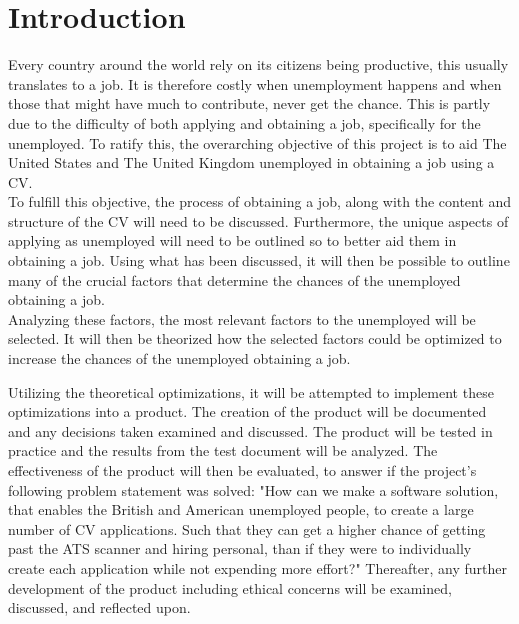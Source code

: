 \section{Introduction}\label{sec:introduction}
Every country around the world rely on its citizens being productive, this usually translates to a job. 
It is therefore costly when unemployment happens and when those that might have much to contribute, never get the chance. 
This is partly due to the difficulty of both applying and obtaining a job, specifically for the unemployed. 
To ratify this, the overarching objective of this project is to aid The United States and The United Kingdom unemployed in obtaining a job using a CV. \\

To fulfill this objective, the process of obtaining a job, along with the content and structure of the CV will need to be discussed.
Furthermore, the unique aspects of applying as unemployed will need to be outlined so to better aid them in obtaining a job.
Using what has been discussed, it will then be possible to outline many of the crucial factors that determine the chances of the unemployed obtaining a job. \\

Analyzing these factors, the most relevant factors to the unemployed will be selected.
It will then be theorized how the selected factors could be optimized to increase the chances of the unemployed obtaining a job.

Utilizing the theoretical optimizations, it will be attempted to implement these optimizations into a product.
The creation of the product will be documented and any decisions taken examined and discussed. 
The product will be tested in practice and the results from the test document will be analyzed.
The effectiveness of the product will then be evaluated, to answer if the project's following problem statement was solved: "How can we make a software solution, that enables the British and American unemployed people, 
to create a large number of CV applications.
Such that they can get a higher chance of getting past the ATS scanner and hiring personal, than
if they were to individually create each application while not expending more effort?"
Thereafter, any further development of the product including ethical concerns will be examined, discussed, and reflected upon. \\

\newpage


